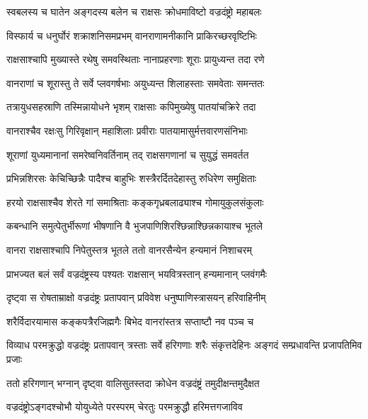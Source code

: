 
\twolineshloka
{स्वबलस्य च घातेन अङ्गदस्य बलेन च}
{राक्षसः क्रोधमाविष्टो वज्रदंष्ट्रो महाबलः} %

\twolineshloka
{विस्फार्य च धनुर्घोरं शक्राशनिसमप्रभम्}
{वानराणामनीकानि प्राकिरच्छरवृष्टिभिः} %

\twolineshloka
{राक्षसाश्चापि मुख्यास्ते रथेषु समवस्थिताः}
{नानाप्रहरणाः शूराः प्रायुध्यन्त तदा रणे} %

\twolineshloka
{वानराणां च शूरास्तु ते सर्वे प्लवगर्षभाः}
{अयुध्यन्त शिलाहस्ताः समवेताः समन्ततः} %

\twolineshloka
{तत्रायुधसहस्राणि तस्मिन्नायोधने भृशम्}
{राक्षसाः कपिमुख्येषु पातयांचक्रिरे तदा} %

\twolineshloka
{वानराश्चैव रक्षःसु गिरिवृक्षान् महाशिलाः}
{प्रवीराः पातयामासुर्मत्तवारणसंनिभाः} %

\twolineshloka
{शूराणां युध्यमानानां समरेष्वनिवर्तिनाम्}
{तद् राक्षसगणानां च सुयुद्धं समवर्तत} %

\twolineshloka
{प्रभिन्नशिरसः केचिच्छिन्नैः पादैश्च बाहुभिः}
{शस्त्रैरर्दितदेहास्तु रुधिरेण समुक्षिताः} %

\twolineshloka
{हरयो राक्षसाश्चैव शेरते गां समाश्रिताः}
{कङ्कगृध्रबलाढ्याश्च गोमायुकुलसंकुलाः} %

\twolineshloka
{कबन्धानि समुत्पेतुर्भीरूणां भीषणानि वै}
{भुजपाणिशिरश्छिन्नाश्छिन्नकायाश्च भूतले} %

\twolineshloka
{वानरा राक्षसाश्चापि निपेतुस्तत्र भूतले}
{ततो वानरसैन्येन हन्यमानं निशाचरम्} %

\twolineshloka
{प्राभज्यत बलं सर्वं वज्रदंष्ट्रस्य पश्यतः}
{राक्षसान् भयवित्रस्तान् हन्यमानान् प्लवंगमैः} %

\twolineshloka
{दृष्ट्वा स रोषताम्राक्षो वज्रदंष्ट्रः प्रतापवान्}
{प्रविवेश धनुष्पाणिस्त्रासयन् हरिवाहिनीम्} %

\twolineshloka
{शरैर्विदारयामास कङ्कपत्रैरजिह्मगैः}
{बिभेद वानरांस्तत्र सप्ताष्टौ नव पञ्च च} %

\threelineshloka
{विव्याध परमक्रुद्धो वज्रदंष्ट्रः प्रतापवान्}
{त्रस्ताः सर्वे हरिगणाः शरैः संकृत्तदेहिनः}
{अङ्गदं सम्प्रधावन्ति प्रजापतिमिव प्रजाः} %

\twolineshloka
{ततो हरिगणान् भग्नान् दृष्ट्वा वालिसुतस्तदा}
{क्रोधेन वज्रदंष्ट्रं तमुदीक्षन्तमुदैक्षत} %

\twolineshloka
{वज्रदंष्ट्रोऽङ्गदश्चोभौ योयुध्येते परस्परम्}
{चेरतुः परमक्रुद्धौ हरिमत्तगजाविव} %

